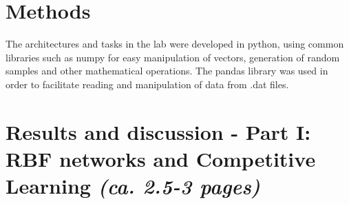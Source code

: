 \documentclass[a4paper]{article}
\begin{document}

\section{Methods}
The architectures and tasks in the lab were developed in python, using common libraries such as numpy for easy manipulation of vectors, generation of random samples and other mathematical operations. The pandas library was used in order to facilitate reading and manipulation of data from .dat files.
\section{Results and discussion - Part I: RBF networks and Competitive Learning \normalsize{\textit{(ca. 2.5-3 pages)}}}
\end{document}

